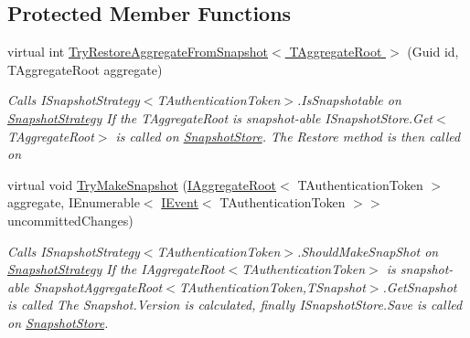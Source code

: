 \subsection*{Protected Member Functions}
\begin{DoxyCompactItemize}
\item 
virtual int \hyperlink{classCqrs_1_1Akka_1_1Snapshots_1_1AkkaSnapshotRepository_aeec6fc99d17848302d908361ea407908_aeec6fc99d17848302d908361ea407908}{Try\+Restore\+Aggregate\+From\+Snapshot$<$ T\+Aggregate\+Root $>$} (Guid id, T\+Aggregate\+Root aggregate)
\begin{DoxyCompactList}\small\item\em Calls I\+Snapshot\+Strategy$<$\+T\+Authentication\+Token$>$.\+Is\+Snapshotable on \hyperlink{classCqrs_1_1Akka_1_1Snapshots_1_1AkkaSnapshotRepository_ad230c1d7f2d70973cdf116b14fcd0ab0_ad230c1d7f2d70973cdf116b14fcd0ab0}{Snapshot\+Strategy} If the {\itshape T\+Aggregate\+Root}  is snapshot-\/able I\+Snapshot\+Store.\+Get$<$\+T\+Aggregate\+Root$>$ is called on \hyperlink{classCqrs_1_1Akka_1_1Snapshots_1_1AkkaSnapshotRepository_a83f16c1598f3df2a8889fdf5cab5dfb9_a83f16c1598f3df2a8889fdf5cab5dfb9}{Snapshot\+Store}. The Restore method is then called on \end{DoxyCompactList}\item 
virtual void \hyperlink{classCqrs_1_1Akka_1_1Snapshots_1_1AkkaSnapshotRepository_ae9df38e7f69f1cae3c080fcf8a998a18_ae9df38e7f69f1cae3c080fcf8a998a18}{Try\+Make\+Snapshot} (\hyperlink{interfaceCqrs_1_1Domain_1_1IAggregateRoot}{I\+Aggregate\+Root}$<$ T\+Authentication\+Token $>$ aggregate, I\+Enumerable$<$ \hyperlink{interfaceCqrs_1_1Events_1_1IEvent}{I\+Event}$<$ T\+Authentication\+Token $>$$>$ uncommitted\+Changes)
\begin{DoxyCompactList}\small\item\em Calls I\+Snapshot\+Strategy$<$\+T\+Authentication\+Token$>$.\+Should\+Make\+Snap\+Shot on \hyperlink{classCqrs_1_1Akka_1_1Snapshots_1_1AkkaSnapshotRepository_ad230c1d7f2d70973cdf116b14fcd0ab0_ad230c1d7f2d70973cdf116b14fcd0ab0}{Snapshot\+Strategy} If the I\+Aggregate\+Root$<$\+T\+Authentication\+Token$>$ is snapshot-\/able Snapshot\+Aggregate\+Root$<$\+T\+Authentication\+Token,\+T\+Snapshot$>$.\+Get\+Snapshot is called The Snapshot.\+Version is calculated, finally I\+Snapshot\+Store.\+Save is called on \hyperlink{classCqrs_1_1Akka_1_1Snapshots_1_1AkkaSnapshotRepository_a83f16c1598f3df2a8889fdf5cab5dfb9_a83f16c1598f3df2a8889fdf5cab5dfb9}{Snapshot\+Store}. \end{DoxyCompactList}\end{DoxyCompactItemize}
